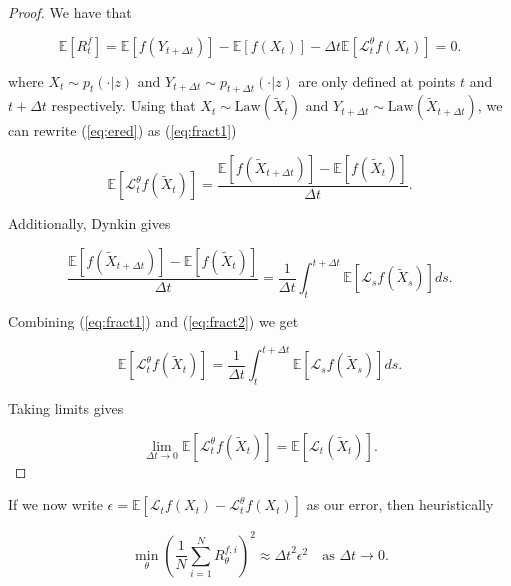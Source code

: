 \documentclass[12pt]{article}
\theoremstyle{break}
\begin{document}
\begin{proof}
	We have that

	\begin{equation}
		\mathbb{E}[R^f_t] = \mathbb{E}[f(Y_{t+\Delta t})] - \mathbb{E}[f(X_t)] - \Delta t \mathbb{E}[\mathcal{L}_t^\theta f(X_t)] = 0.
		\label{eq:ered}
	\end{equation}

	where $X_t \sim p_t(\cdot|z)$ and $Y_{t+\Delta t} \sim p_{t + \Delta t}(\cdot | z)$ are only defined at points $t$ and $t + \Delta t$ respectively. Using that $X_t \sim \text{Law}(\tilde X_t)$ and $Y_{t+\Delta t} \sim \text{Law}(\tilde X_{t + \Delta t})$, we can rewrite (\ref{eq:ered}) as (\ref{eq:fract1})

	\begin{equation}
		\mathbb{E}[\mathcal{L}_t^\theta f(\tilde X_t)] = \frac{\mathbb{E}[f(\tilde X_{t+\Delta t})] - \mathbb{E}[f(\tilde X_t)]}{\Delta t}.
		\label{eq:fract1}
	\end{equation}

	Additionally, Dynkin gives

	\begin{equation}
		\frac{\mathbb{E}[f(\tilde X_{t+\Delta t})] - \mathbb{E}[f(\tilde X_t)]}{\Delta t} = \frac{1}{\Delta t} \int_t^{t+\Delta t}\mathbb{E}[\mathcal{L}_s f(\tilde X_s)]ds.
		\label{eq:fract2}
	\end{equation}

	Combining (\ref{eq:fract1}) and (\ref{eq:fract2}) we get

	\begin{equation}
		\mathbb{E}[\mathcal{L}_t^\theta f(\tilde X_t)] = \frac{1}{\Delta t} \int_t^{t+\Delta t}\mathbb{E}[\mathcal{L}_sf(\tilde X_s)]ds.
	\end{equation}

	Taking limits gives

	\begin{equation}
		\lim_{\Delta t \to 0} \mathbb{E}[\mathcal{L}_t^\theta f(\tilde X_t)] = \mathbb{E}[\mathcal{L}_t(\tilde X_t)].
	\end{equation}
\end{proof}

If we now write $\epsilon = \mathbb{E}[\mathcal{L}_tf(X_t) - \mathcal{L}_t^\theta f(X_t)]$ as our error, then heuristically 

\begin{equation}
	\min_\theta \left( \frac{1}{N} \sum_{i=1}^N R_\theta^{f, i}\right)^2 \approx {\Delta t}^2 \epsilon^2 \quad \text{as }\Delta t \to 0.
	\label{eq:order}
\end{equation}
\end{document}

